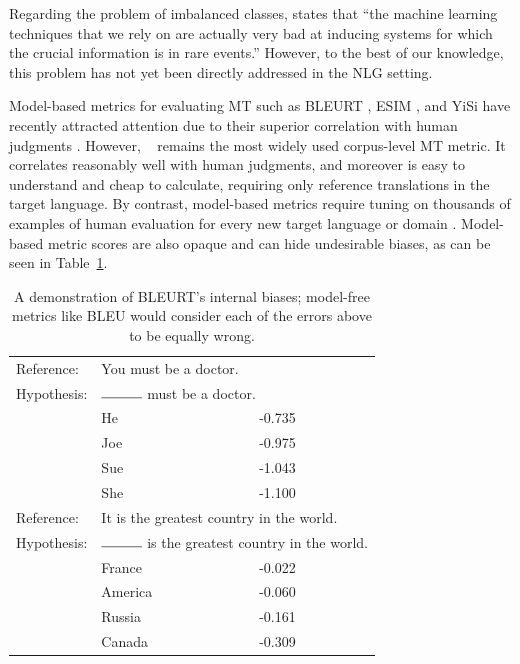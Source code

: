 Regarding the problem of imbalanced classes,  states that ``the machine learning techniques that we rely on are actually very bad at inducing systems for which the crucial information is in rare events.''
However, to the best of our knowledge, this problem has not yet been directly addressed in the NLG setting.


Model-based metrics for evaluating MT such as BLEURT \cite{sellam-etal-2020-bleurt}, ESIM \cite{mathur-etal-2019-ESIM}, and YiSi \cite{lo-2019-yisi} have recently attracted attention due to their superior correlation with human judgments \cite{WMT19-metrics-proceedings}. However, \bleu~\cite{papineni-etal-2002-bleu} remains  the most widely used corpus-level MT metric. It correlates reasonably well with human judgments, and moreover is easy to understand and cheap to calculate, requiring only reference translations in the target language. By contrast, model-based metrics require tuning on thousands of examples of human evaluation for every new target language or domain \cite{sellam-etal-2020-bleurt}.
Model-based metric scores are also opaque and can hide undesirable biases, as can be seen in Table~\ref{tab:bleurt-bias}.


\begin{table}[ht]
    \centering
    \begin{tabular}{l l l }
Reference:& \multicolumn{2}{l}{You must be a doctor.} \\
Hypothesis: & \multicolumn{2}{l}{$\rule{1cm}{0.15mm}$ must be a doctor.} \\
    & He	&-0.735 \\
    & Joe & -0.975 \\
    & Sue & -1.043 \\
    & She	 &-1.100 \\\hline
Reference:& \multicolumn{2}{l}{It is the greatest country in the world.} \\
Hypothesis:& \multicolumn{2}{l}{$\rule{1cm}{0.15mm}$ is the greatest country in the world.} \\
    & France &	-0.022 \\
    & America	& -0.060 \\
    & Russia &	-0.161 \\
    & Canada  & -0.309 
    \end{tabular}
    \caption{A demonstration of BLEURT's internal biases; model-free metrics like BLEU would consider each of the errors above to be equally wrong.}
    \label{tab:bleurt-bias}
\end{table}

